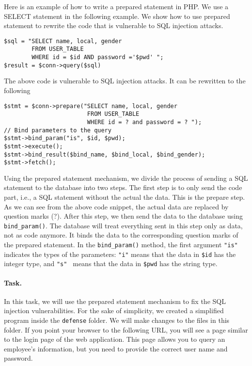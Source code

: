 Here is an example of how to write a prepared statement in PHP.  We use a SELECT statement in
the following example.  We show how to use prepared statement to rewrite the code that is
vulnerable to SQL injection attacks.


\begin{lstlisting}
$sql = "SELECT name, local, gender  
        FROM USER_TABLE 
        WHERE id = $id AND password ='$pwd' ";
$result = $conn->query($sql)
\end{lstlisting}

The above code is vulnerable to SQL injection attacks. 
It can be rewritten to the following


\begin{lstlisting}
$stmt = $conn->prepare("SELECT name, local, gender
                        FROM USER_TABLE 
                        WHERE id = ? and password = ? ");
// Bind parameters to the query
$stmt->bind_param("is", $id, $pwd);
$stmt->execute();
$stmt->bind_result($bind_name, $bind_local, $bind_gender);
$stmt->fetch();
\end{lstlisting}


Using the prepared statement mechanism, we divide the process of sending
a SQL statement to the database into two steps.  
The first step is to only send the code part, i.e., a SQL statement without 
the actual the data. This is the prepare step. As we can see from the 
above code snippet, the actual data are replaced by question
marks (?).  After this step, we then send the data to the database using 
{\tt bind\_param()}.
The database will treat everything sent in this step only as 
data, not as code anymore. It binds the data to the corresponding
question marks of the prepared statement. 
In the {\tt bind\_param()} method, the first argument {\tt "is"} indicates
the types of the parameters: \texttt{"i"} means  
that the data in {\tt \$id} has the integer type,
and \texttt{"s" } means that the data in {\tt \$pwd} has the string type.


\paragraph{Task.} In this task, we will use the prepared statement mechanism to 
fix the SQL injection vulnerabilities. For the sake of simplicity, we 
created a simplified program inside the \texttt{defense} folder. We 
will make changes to the files in this folder. 
If you point your browser to the following URL, you will see a page similar
to the login page of the web application. This page allows you to query an 
employee's information, but you need to provide the correct 
user name and password. 


